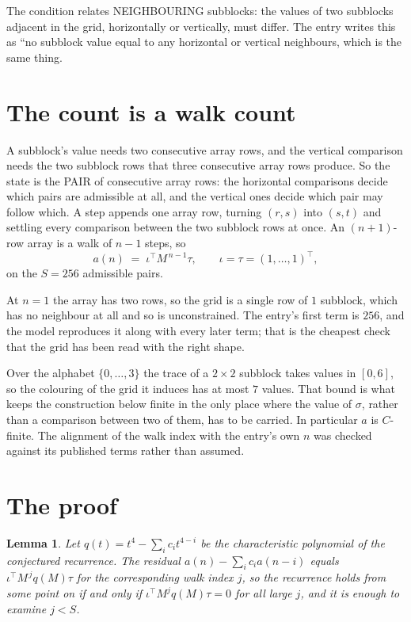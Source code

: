 \documentclass[11pt,a4paper]{article}
\theoremstyle{plain}
\newtheorem{lemma}[theorem]{Lemma}
\theoremstyle{definition}
\begin{document}
The condition relates NEIGHBOURING subblocks: the values of two subblocks adjacent in the grid,
horizontally or vertically, must differ. The entry writes this as ``no subblock value equal to any horizontal or vertical neighbours, which is the same thing.

\section{The count is a walk count}

A subblock's value needs two consecutive array rows, and the vertical
comparison needs the two subblock rows that three consecutive array rows produce. So the state
is the PAIR of consecutive array rows: the horizontal comparisons decide which pairs are
admissible at all, and the vertical ones decide which pair may follow which. A step appends one
array row, turning $(r,s)$ into $(s,t)$ and settling every comparison between the two subblock
rows at once. An $(n+1)$-row array is a walk of $n-1$ steps, so
\[
a(n)\;=\;\iota^{\!\top}M^{\,n-1}\tau,\qquad\iota=\tau=(1,\dots,1)^{\!\top},
\]
on the $S=256$ admissible pairs.

At $n=1$ the array has two rows, so the grid is a single row of $1$
subblock, which has no neighbour at all and so is unconstrained. The
entry's first term is $256$, and the model reproduces it along with every later term; that
is the cheapest check that the grid has been read with the right shape.

Over the alphabet $\{0,\dots,3\}$ the trace of a $2\times2$ subblock takes values in
$[0,6]$, so the colouring of the grid it induces has at most $7$ values.
That bound is what keeps the construction below finite in the only place where the value of
$\sigma$, rather than a comparison between two of them, has to be carried.
In particular $a$ is $C$-finite. The alignment of the walk index with the entry's own $n$ was
checked against its published terms rather than assumed.

\section{The proof}

\begin{lemma}\label{lem:crit}
Let $q(t)=t^{4}-\sum_i c_it^{4-i}$ be the characteristic polynomial of the
conjectured recurrence. The residual $a(n)-\sum_ic_ia(n-i)$ equals
$\iota^{\!\top}M^{\,j}q(M)\tau$ for the corresponding walk index $j$, so the recurrence
holds from some point on if and only if $\iota^{\!\top}M^{j}q(M)\tau=0$ for all large $j$,
and it is enough to examine $j<S$.
\end{lemma}
\end{document}
